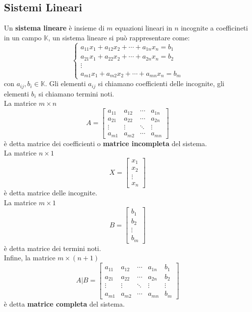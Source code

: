 \documentclass[../main.tex]{subfiles}
\begin{document}
\subsection{Sistemi Lineari}
Un \textbf{sistema lineare} è insieme di $m$ equazioni lineari in $n$ incognite
a coefficineti in un campo $\mathbb{K}$, un sistema lineare si può
rappresentare come:
\[
    \begin{cases}
        a_{11}x_1 + a_{12}x_2 + \cdots + a_{1n}x_n = b_1 \\
        a_{21}x_1 + a_{22}x_2 + \cdots + a_{2n}x_n = b_2 \\
        \vdots                                           \\
        a_{m1}x_1 + a_{m2}x_2 + \cdots + a_{mn}x_n = b_m
    \end{cases}
\]
con $a_{ij}, b_i \in \mathbb{K}$. Gli elementi $a_{ij}$ si chiamano
coefficienti delle incognite, gli elementi $b_i$ si chiamano termini noti.\\ La
matrice $m\times n$
\[
    A = \begin{bmatrix}
        a_{11} & a_{12} & \cdots & a_{1n} \\
        a_{21} & a_{22} & \cdots & a_{2n} \\
        \vdots & \vdots & \ddots & \vdots \\
        a_{m1} & a_{m2} & \cdots & a_{mn}
    \end{bmatrix}
\]
è detta matrice dei coefficienti o \textbf{matrice incompleta} del sistema.\\
La matrice $n\times 1$
\[
    X = \begin{bmatrix}
        x_1    \\
        x_2    \\
        \vdots \\
        x_n
    \end{bmatrix}
\]
è detta matrice delle incognite.\\
La matrice $m\times 1$
\[
    B = \begin{bmatrix}
        b_1    \\
        b_2    \\
        \vdots \\
        b_m
    \end{bmatrix}
\]
è detta matrice dei termini noti.\\
Infine, la matrice $m\times (n+1)$
\[
    A|B = \begin{bmatrix}
        a_{11} & a_{12} & \cdots & a_{1n} & b_1    \\
        a_{21} & a_{22} & \cdots & a_{2n} & b_2    \\
        \vdots & \vdots & \ddots & \vdots & \vdots \\
        a_{m1} & a_{m2} & \cdots & a_{mn} & b_m
    \end{bmatrix}
\]
è detta \textbf{matrice completa} del sistema.
\end{document}
